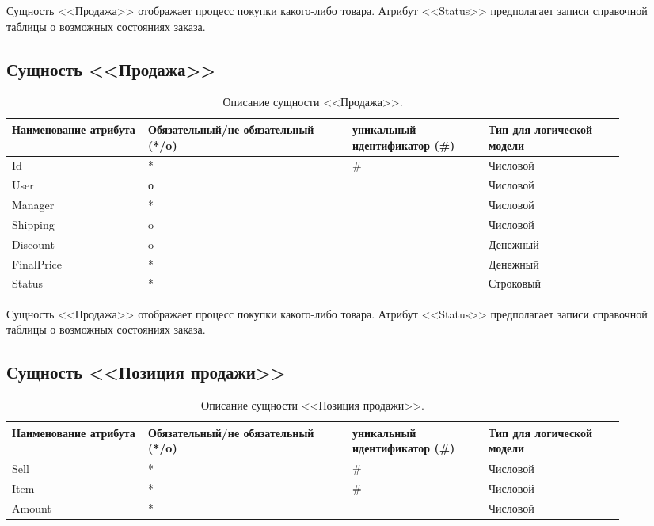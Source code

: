 \documentclass[14pt]{extreport}
\begin{document}
        Сущность <<Продажа>> отображает процесс покупки какого-либо товара. Атрибут <<Status>> предполагает записи справочной таблицы о возможных состояниях заказа.
    
        \subsection*{Сущность <<Продажа>>}

        \begin{table}[H]
            \begin{tabular}{|p{0.2\linewidth}|p{0.3\linewidth}|p{0.2\linewidth}|p{0.2\linewidth}|}
                \hline
                Наименование атрибута & Обязательный/не обязательный (*/o) & уникальный идентификатор (\#) & Тип для логической модели
                \\ \hline
                Id & * & \# & Числовой \\ \hline
                User & о & & Числовой\\ \hline
                Manager & * & & Числовой\\ \hline
                Shipping & o & & Числовой \\ \hline
                Discount & o & & Денежный \\ \hline  
                FinalPrice & * & & Денежный \\ \hline
                Status & * & & Строковый \\ \hline
            \end{tabular}
            \caption{Описание сущности <<Продажа>>.}
        \end{table}

        Сущность <<Продажа>> отображает процесс покупки какого-либо товара. Атрибут <<Status>> предполагает записи справочной таблицы о возможных состояниях заказа.
    
    \subsection*{Сущность <<Позиция продажи>>}

        \begin{table}[H]
            \begin{tabular}{|p{0.2\linewidth}|p{0.3\linewidth}|p{0.2\linewidth}|p{0.2\linewidth}|}
                \hline
                Наименование атрибута & Обязательный/не обязательный (*/o) & уникальный идентификатор (\#) & Тип для логической модели
                \\ \hline
                Sell & * & \# & Числовой\\ \hline
                Item & * & \# & Числовой \\ \hline
                Amount & * & & Числовой \\ \hline
            \end{tabular}
            \caption{Описание сущности <<Позиция продажи>>.}
        \end{table}
\end{document}
